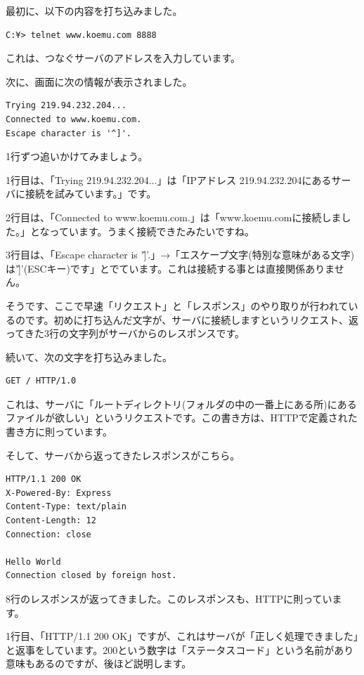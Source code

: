 \documentclass[a4j,11pt,openany]{jsbook}
\begin{document}
最初に、以下の内容を打ち込みました。

\begin{lstlisting}
C:¥> telnet www.koemu.com 8888
\end{lstlisting}

これは、つなぐサーバのアドレスを入力しています。

次に、画面に次の情報が表示されました。

\begin{lstlisting}
Trying 219.94.232.204...
Connected to www.koemu.com.
Escape character is '^]'.
\end{lstlisting}

1行ずつ追いかけてみましょう。

1行目は、「Trying 219.94.232.204...」は「IPアドレス 219.94.232.204にあるサーバに接続を試みています。」です。

2行目は、「Connected to www.koemu.com.」は「www.koemu.comに接続しました。」となっています。うまく接続できたみたいですね。

3行目は、「Escape character is '\^]'.」→「エスケープ文字(特別な意味がある文字)は'\^]'(ESCキー)です」とでています。これは接続する事とは直接関係ありません。

そうです、ここで早速「リクエスト」と「レスポンス」のやり取りが行われているのです。初めに打ち込んだ文字が、サーバに接続しますというリクエスト、返ってきた3行の文字列がサーバからのレスポンスです。

続いて、次の文字を打ち込みました。

\begin{lstlisting}
GET / HTTP/1.0
\end{lstlisting}

これは、サーバに「ルートディレクトリ(フォルダの中の一番上にある所)にあるファイルが欲しい」というリクエストです。この書き方は、HTTPで定義された書き方に則っています。

そして、サーバから返ってきたレスポンスがこちら。

\begin{lstlisting}
HTTP/1.1 200 OK
X-Powered-By: Express
Content-Type: text/plain
Content-Length: 12
Connection: close

Hello World
Connection closed by foreign host.
\end{lstlisting}

8行のレスポンスが返ってきました。このレスポンスも、HTTPに則っています。

1行目、「HTTP/1.1 200 OK」ですが、これはサーバが「正しく処理できました」と返事をしています。200という数字は「ステータスコード」という名前があり意味もあるのですが、後ほど説明します。
\end{document}
